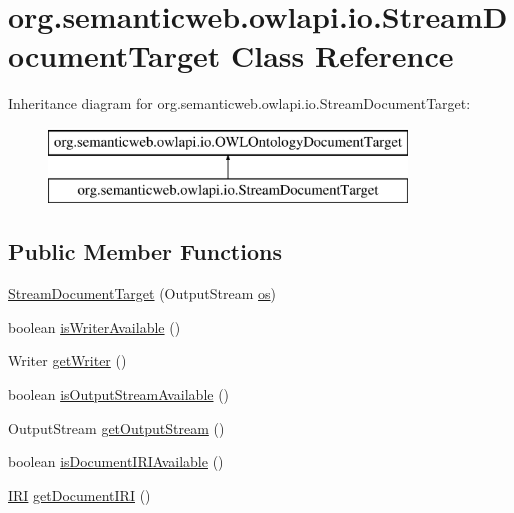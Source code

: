 \hypertarget{classorg_1_1semanticweb_1_1owlapi_1_1io_1_1_stream_document_target}{\section{org.\-semanticweb.\-owlapi.\-io.\-Stream\-Document\-Target Class Reference}
\label{classorg_1_1semanticweb_1_1owlapi_1_1io_1_1_stream_document_target}
}
Inheritance diagram for org.\-semanticweb.\-owlapi.\-io.\-Stream\-Document\-Target\-:\begin{figure}[H]
\begin{center}
\leavevmode
\includegraphics[height=2.000000cm]{classorg_1_1semanticweb_1_1owlapi_1_1io_1_1_stream_document_target}
\end{center}
\end{figure}
\subsection*{Public Member Functions}
\begin{DoxyCompactItemize}
\item 
\hyperlink{classorg_1_1semanticweb_1_1owlapi_1_1io_1_1_stream_document_target_a9010fe708bc46a4255e47c1e52b1750d}{Stream\-Document\-Target} (Output\-Stream \hyperlink{classorg_1_1semanticweb_1_1owlapi_1_1io_1_1_stream_document_target_ab2fb08fb15ccf213bef96fe42badcff3}{os})
\item 
boolean \hyperlink{classorg_1_1semanticweb_1_1owlapi_1_1io_1_1_stream_document_target_a6cd9349cd325755d7a648381bc2745fe}{is\-Writer\-Available} ()
\item 
Writer \hyperlink{classorg_1_1semanticweb_1_1owlapi_1_1io_1_1_stream_document_target_aa13fbea314b0029108874f0ad3fdeb9b}{get\-Writer} ()
\item 
boolean \hyperlink{classorg_1_1semanticweb_1_1owlapi_1_1io_1_1_stream_document_target_aa6b726f819aa1df0ec74c9282fc6e20a}{is\-Output\-Stream\-Available} ()
\item 
Output\-Stream \hyperlink{classorg_1_1semanticweb_1_1owlapi_1_1io_1_1_stream_document_target_a9f53c7a7d5921ae19fb0f9bfdffbe81d}{get\-Output\-Stream} ()
\item 
boolean \hyperlink{classorg_1_1semanticweb_1_1owlapi_1_1io_1_1_stream_document_target_a49952057dc6d03a01feee0700a0e42ff}{is\-Document\-I\-R\-I\-Available} ()
\item 
\hyperlink{classorg_1_1semanticweb_1_1owlapi_1_1model_1_1_i_r_i}{I\-R\-I} \hyperlink{classorg_1_1semanticweb_1_1owlapi_1_1io_1_1_stream_document_target_aec2b5b98c3e2e730d16bc13380023765}{get\-Document\-I\-R\-I} ()
\end{DoxyCompactItemize}
